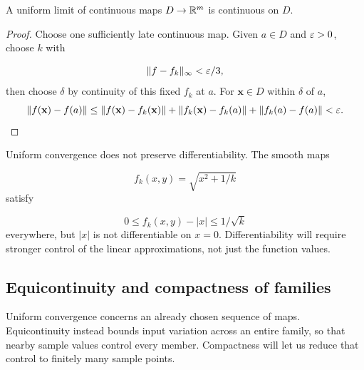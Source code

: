 \begin{center}\end{center}

\begin{theorem}\label{thm:uniform-map-continuity}
A uniform limit of continuous maps $D\to\mathbb{R}^m$ is continuous on $D$.
\end{theorem}
\begin{proof}
Choose one sufficiently late continuous map.
Given $a\in D$ and $\varepsilon>0$, choose $k$ with

\[
\|f-f_k\|_\infty<\varepsilon/3,
\]
 then choose $\delta$ by continuity of this
fixed $f_k$ at $a$. For $\mathbf{x}\in D$ within $\delta$ of $a$,
\[
\|f(\mathbf{x})-f(a)\|\leq\|f(\mathbf{x})-f_k(\mathbf{x})\|+
\|f_k(\mathbf{x})-f_k(a)\|+\|f_k(a)-f(a)\|<\varepsilon.
\]
\end{proof}
Uniform convergence does not preserve differentiability. The smooth maps

\[
f_k(x,y)=\sqrt{x^2+1/k}
\]
 satisfy

\[
0\leq f_k(x,y)-|x|\leq1/\sqrt k
\]
 everywhere, but $|x|$ is not
differentiable on $x=0$. Differentiability will require stronger control
of the linear approximations, not just the function values.

\subsection{Equicontinuity and compactness of families}

Uniform convergence concerns an already chosen sequence of maps.
Equicontinuity instead bounds input variation across an entire family,
so that nearby sample values control every member. Compactness will let
us reduce that control to finitely many sample points.

